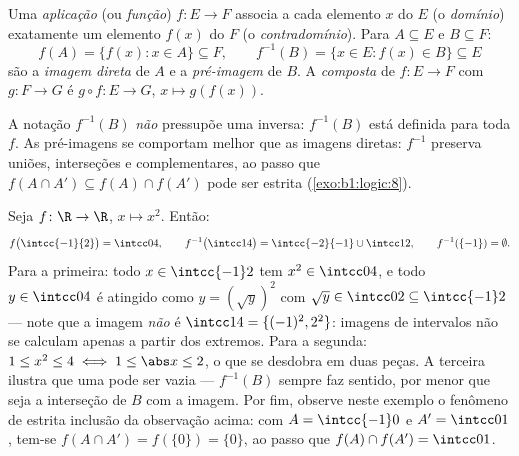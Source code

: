 \begin{definition}\label{def:b1:logic:map}
Uma \emph{aplicação} (ou \emph{função}) $f \colon E \to F$
associa a cada elemento $x$ do  $E$ (o \emph{domínio}) exatamente
um elemento $f(x)$ do  $F$ (o \emph{contradomínio}). Para $A
\subseteq E$ e $B \subseteq F$:
\[
f(A) = \{f(x) : x \in A\} \subseteq F,
\qquad
f^{-1}(B) = \{x \in E : f(x) \in B\} \subseteq E
\]
são a \emph{imagem direta} de $A$ e a \emph{pré-imagem}
 de $B$. A \emph{composta} de $f \colon E \to F$
com $g \colon F \to G$ é $g \circ f \colon E \to G$, $x \mapsto
g(f(x))$.
\end{definition}

\begin{remark}
A notação $f^{-1}(B)$ \emph{não} pressupõe uma  inversa:
$f^{-1}(B)$ está definida para toda $f$. As pré-imagens se comportam
melhor que as imagens diretas: $f^{-1}$ preserva uniões, interseções e
complementares, ao passo que $f(A \cap A') \subseteq f(A) \cap f(A')$ pode ser
estrita (\cref{exo:b1:logic:8}).
\end{remark}

\begin{example}\label{ex:b1:logic:images}
Seja $f \colon \R \to \R$, $x \mapsto x^2$. Então:
\[
f\bigl(\intcc{-1}{2}\bigr) = \intcc04, \qquad
f^{-1}\bigl(\intcc14\bigr) = \intcc{-2}{-1} \cup \intcc12, \qquad
f^{-1}(\{-1\}) = \emptyset .
\]
Para a primeira: todo $x \in \intcc{-1}2$ tem $x^2 \in \intcc04$, e
todo $y \in \intcc04$ é atingido como $y = (\sqrt y)^2$ com $\sqrt y
\in \intcc02 \subseteq \intcc{-1}2$ --- note que a imagem \emph{não} é
$\intcc14 = \{(-1)^2, 2^2\}$: imagens de intervalos não se
calculam apenas a partir dos extremos. Para a segunda: $1 \leq x^2 \leq 4 \iff
1 \leq \abs x \leq 2$, o que se desdobra em duas peças. A terceira
ilustra que uma  pode ser vazia --- $f^{-1}(B)$ sempre faz
sentido, por menor que seja a interseção de $B$ com a imagem. Por fim,
observe neste exemplo o fenômeno de estrita inclusão da observação acima:
com $A = \intcc{-1}0$ e $A' = \intcc01$, tem-se $f(A \cap A') =
f(\{0\}) = \{0\}$, ao passo que $f(A) \cap f(A') = \intcc01$.
\end{example}

